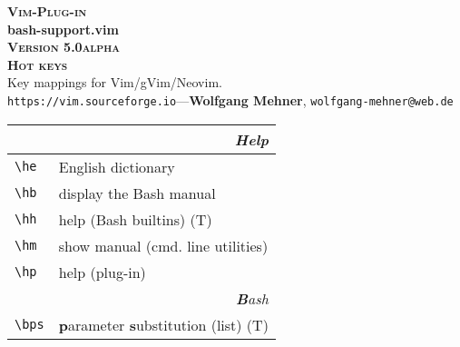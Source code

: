 \documentclass[oneside,11pt,landscape,DIV16]{scrartcl}
\newcommand{\Pluginversion}{5.0alpha}
\begin{document}
%

\begin{multicols}{3}
%
\begin{center}
%
\textbf{\textsc{\small{Vim-Plug-in}}}\\
\textbf{\LARGE{bash-support.vim}}\\
\textbf{\textsc{\small{Version \Pluginversion}}}\\
\vspace{1mm}%
\textbf{\textsc{\Huge{Hot keys}}}\\ 
\vspace{1mm}%
Key mappings for Vim/gVim/Neovim.\\
{\tiny  \texttt{https://vim.sourceforge.io}\hspace{1.5mm}---\hspace{1.5mm}\textbf{Wolfgang Mehner},  \texttt{wolfgang-mehner@web.de}}\\
\vspace{1.0mm}
%
\begin{tabular}[]{|p{11mm}|p{60mm}|}
\hline
\multicolumn{2}{|r|}{\textsl{\textbf{H}elp}}\\[1.0ex]
\hline \verb'\he'   & English dictionary                \\
\hline \verb'\hb'   & display the Bash manual           \\
\hline \verb'\hh'   & help (Bash builtins)              \hfill (T)\\
\hline \verb'\hm'   & show manual (cmd. line utilities) \\
\hline \verb'\hp'   & help (plug-in)                    \\
\hline
\hline 
\multicolumn{2}{|r|}{\textsl{\textbf{B}ash}}\\[1.0ex]
\hline \verb'\bps'   & \textbf{p}arameter \textbf{s}ubstitution (list) \hfill (T)\\

\end{tabular}
\end{center}
\end{multicols}
\end{document}
